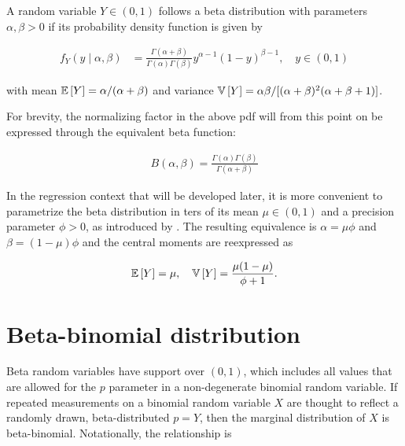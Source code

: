 A random variable $Y \in (0,1)$ follows a beta distribution with parameters $\alpha, \beta > 0$ if its probability density function is given by

\begin{equation}
\begin{split}
f_{Y}(y \mid \alpha, \beta)
&= \frac{\Gamma(\alpha+\beta)}{\Gamma(\alpha)\Gamma(\beta)}y^{\alpha-1}(1-y)^{\beta-1},\quad y \in (0,1)
\end{split}
\end{equation}

with mean ${\mathbb E}\left[ Y \right] = \alpha / (\alpha+ \beta)$ and variance ${\mathbb V}\left[ Y \right] = \alpha \beta/[(\alpha+\beta)^2(\alpha+\beta+1)]$.

For brevity, the normalizing factor in the above pdf will from this point on be expressed through the equivalent beta function:

\begin{equation}
\label{beta-function}
\begin{split}
B(\alpha, \beta) = \frac{\Gamma(\alpha)\Gamma(\beta)}{\Gamma(\alpha+\beta)}
\end{split}
\end{equation}

In the regression context that will be developed later, it is more convenient to parametrize the beta distribution in ters of its mean $\mu \in (0,1)$ and a precision parameter $\phi > 0$, as introduced by \cite{ferrari2004beta}. The resulting equivalence is  $\alpha = \mu\phi$ and $\beta = (1-\mu)\phi$ and the central moments are reexpressed as

\begin{equation}
\begin{split}
{\mathbb E}\left[ Y \right] = \mu, \quad {\mathbb V}\left[ Y \right] = \frac{\mu(1-\mu)}{\phi+1}.
\end{split}
\end{equation}

\section{Beta-binomial distribution}
\label{sec:bbin-dist}

Beta random variables have support over $(0,1)$, which includes all values that are allowed for the $p$ parameter in a non-degenerate binomial random variable. If repeated measurements on a binomial random variable $X$ are thought to reflect a randomly drawn, beta-distributed $p=Y$, then the marginal distribution of $X$ is beta-binomial. Notationally, the relationship is

